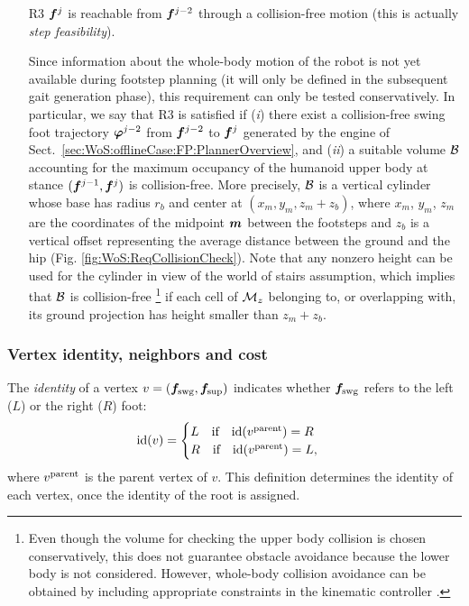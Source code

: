 \begin{itemize}
\smallskip
\item[R3] ${\bm{f}}^j$ is reachable from ${\bm{f}}^{j-2}$ through a collision-free motion (this is actually {\em step feasibility}).

\smallskip
Since information about the whole-body motion of the robot is not yet available during footstep planning (it will only be defined in the subsequent gait generation phase), this requirement can only be tested conservatively. In particular, we say that R3 is satisfied if ({\em i}) there exist a collision-free swing foot trajectory ${\bm{\varphi}}^{j-2}$ from ${\bm{f}}^{j-2}$ to ${\bm{f}}^{j}$ generated by the engine of Sect.~\ref{sec:WoS:offlineCase:FP:PlannerOverview}, and ({\em ii}) a suitable volume ${\cal B}$ accounting for the maximum occupancy of the humanoid upper body at stance $({\bm{f}}^{j-1}, {\bm{f}}^{j})$ is collision-free. More precisely, ${\cal B}$ is a vertical cylinder whose base has radius $r_b$ and center at $(x_m, y_m, z_m + z_b)$, where $x_m$, $y_m$, $z_m$ are the coordinates of the midpoint ${\bm{m}}$ between the footsteps and $z_b$ is a vertical offset representing the average distance between the ground and the hip (Fig. \ref{fig:WoS:ReqCollisionCheck}). 
Note that any nonzero height can be used for the cylinder in view of the world of stairs assumption, which implies that ${\cal B}$ is collision-free \footnote{Even though the volume for checking the upper body collision is chosen conservatively, this does not guarantee obstacle avoidance because the lower body is not considered. However, whole-body collision avoidance can be obtained by including appropriate constraints in the kinematic controller \cite{Escande2014IJRR}.} if each cell of ${\cal M}_z$ belonging to, or overlapping with, its ground projection has height smaller than $z_m + z_b$.

\end{itemize}

\medskip

\subsubsection{Vertex identity, neighbors and cost}
\label{sec:WoS:offlineCase:FP:CostFunctions}
The {\em identity} of a vertex $v=({\bm{f}}_{\rm swg}, {\bm{f}}_{\rm sup})$ indicates whether  ${\bm{f}}_{\rm swg}$ refers to the left ($L$) or the right ($R$) foot:
\[
{\rm id}(v)=
\begin{cases}
L\quad \mbox{if} \quad{\rm id}(v^{\rm parent}) = R \\
R\quad \mbox{if} \quad{\rm id}(v^{\rm parent}) = L,
\end{cases}
\]
where $v^{\rm parent}$ is the parent vertex of $v$.
This definition determines the identity of each vertex, once the identity of the root is assigned.

